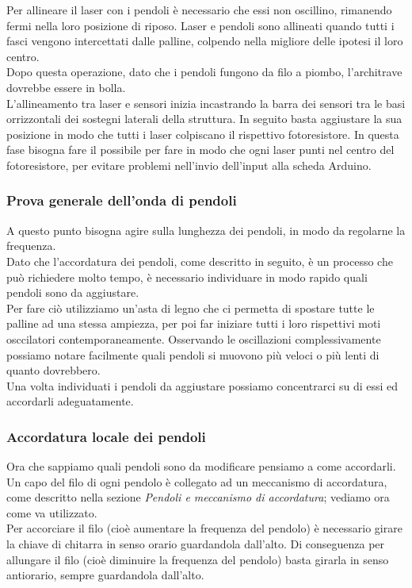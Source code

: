 \documentclass[a4paper]{article}
\begin{document}
Per allineare il laser con i pendoli è necessario che essi non oscillino, rimanendo fermi nella loro posizione di riposo. Laser e pendoli sono allineati quando tutti i fasci vengono intercettati dalle palline, colpendo nella migliore delle ipotesi il loro centro.\\
Dopo questa operazione, dato che i pendoli fungono da filo a piombo, l'architrave dovrebbe essere in bolla.\\

L'allineamento tra laser e sensori inizia incastrando la barra dei sensori tra le basi orrizzontali dei sostegni laterali della struttura. In seguito basta aggiustare la sua posizione in modo che tutti i laser colpiscano il rispettivo fotoresistore. In questa fase bisogna fare il possibile per fare in modo che ogni laser punti nel centro del fotoresistore, per evitare problemi nell'invio dell'input alla scheda Arduino.

\subsubsection*{Prova generale dell'onda di pendoli}

A questo punto bisogna agire sulla lunghezza dei pendoli, in modo da regolarne la frequenza.\\
Dato che l'accordatura dei pendoli, come descritto in seguito, è un processo che può richiedere molto tempo, è necessario individuare in modo rapido quali pendoli sono da aggiustare.\\
Per fare ciò utilizziamo un'asta di legno che ci permetta di spostare tutte le palline ad una stessa ampiezza, per poi far iniziare tutti i loro rispettivi moti osccilatori contemporaneamente. Osservando le oscillazioni complessivamente possiamo notare facilmente quali pendoli si muovono più veloci o più lenti di quanto dovrebbero.\\
Una volta individuati i pendoli da aggiustare possiamo concentrarci su di essi ed accordarli adeguatamente.

\subsubsection*{Accordatura locale dei pendoli}

Ora che sappiamo quali pendoli sono da modificare pensiamo a come accordarli.\\

Un capo del filo di ogni pendolo è collegato ad un meccanismo di accordatura, come descritto nella sezione \textit{Pendoli e meccanismo di accordatura}; vediamo ora come va utilizzato.\\
Per accorciare il filo (cioè aumentare la frequenza del pendolo) è necessario girare la chiave di chitarra in senso orario guardandola dall'alto. Di conseguenza per allungare il filo (cioè diminuire la frequenza del pendolo) basta girarla in senso antiorario, sempre guardandola dall'alto.\\
\end{document}
